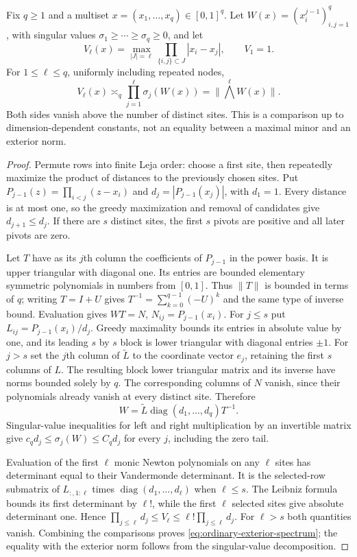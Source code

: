 \begin{proposition}\label{prop:ordinary-spectrum}
Fix $q\ge1$ and a multiset $x=(x_1,\ldots,x_q)\in[0,1]^q$.
Let $W(x)=(x_i^{j-1})_{i,j=1}^q$, with singular values
$\sigma_1\ge\cdots\ge\sigma_q\ge0$, and let
\[
 V_\ell(x)=\max_{|J|=\ell}\prod_{\{i,j\}\subset J}|x_i-x_j|,
 \qquad V_1=1.
\]
For $1\le\ell\le q$, uniformly including repeated nodes,
\begin{equation}\label{eq:ordinary-exterior-spectrum}
 V_\ell(x)\asymp_q\prod_{j=1}^{\ell}\sigma_j(W(x))
                =\|\bigwedge^\ell W(x)\|.
\end{equation}
Both sides vanish above the number of distinct sites. This is a
comparison up to dimension-dependent constants, not an equality between
a maximal minor and an exterior norm.
\end{proposition}
\begin{proof}
Permute rows into finite Leja order: choose a first site, then repeatedly
maximize the product of distances to the previously chosen sites. Put
$P_{j-1}(z)=\prod_{i<j}(z-x_i)$ and $d_j=|P_{j-1}(x_j)|$,
with $d_1=1$. Every distance is at most one, so the greedy maximization
and removal of candidates give $d_{j+1}\le d_j$. If there are $s$
distinct sites, the first $s$ pivots are positive and all later pivots
are zero.

Let $T$ have as its $j$th column the coefficients of $P_{j-1}$ in the
power basis. It is upper triangular with diagonal one. Its entries are
bounded elementary symmetric polynomials in numbers from $[0,1]$.
Thus $\|T\|$ is bounded in terms of $q$; writing $T=I+U$ gives
$T^{-1}=\sum_{k=0}^{q-1}(-U)^k$ and the same type of inverse bound.
Evaluation gives $WT=N$, $N_{ij}=P_{j-1}(x_i)$.
For $j\le s$ put $L_{ij}=P_{j-1}(x_i)/d_j$. Greedy maximality
bounds its entries in absolute value by one, and its leading $s$ by $s$
block is lower triangular with diagonal entries $\pm1$. For $j>s$
set the $j$th column of $\widetilde L$ to the coordinate vector $e_j$,
retaining the first $s$ columns of $L$. The resulting block lower
triangular matrix and its inverse have norms bounded solely by $q$.
The corresponding columns of $N$ vanish, since their polynomials already
vanish at every distinct site. Therefore
\[
 W=\widetilde L\operatorname{diag}(d_1,\ldots,d_q)T^{-1}.
\]
Singular-value inequalities for left and right multiplication by an
invertible matrix give $c_qd_j\le\sigma_j(W)\le C_qd_j$ for every
$j$, including the zero tail.

Evaluation of the first $\ell$ monic Newton polynomials on any
$\ell$ sites has determinant equal to their Vandermonde determinant.
It is the selected-row submatrix of $L_{:,1:\ell}$ times
$\operatorname{diag}(d_1,\ldots,d_\ell)$ when $\ell\le s$.
The Leibniz formula bounds its first determinant by $\ell!$, while the
first $\ell$ selected sites give absolute determinant one. Hence
$\prod_{j\le\ell}d_j\le V_\ell\le\ell!\prod_{j\le\ell}d_j$.
For $\ell>s$ both quantities vanish. Combining the comparisons proves
\eqref{eq:ordinary-exterior-spectrum}; the equality with the exterior
norm follows from the singular-value decomposition.
\end{proof}

